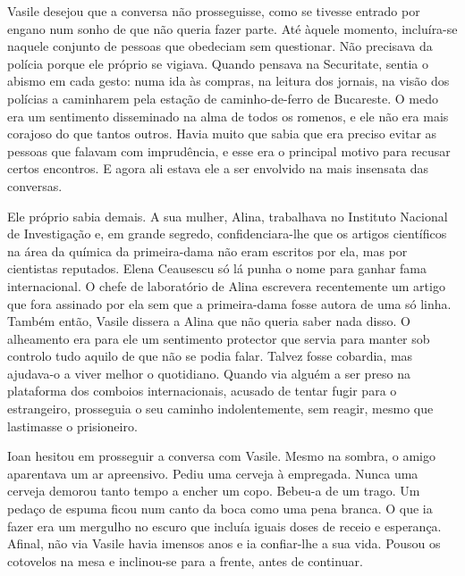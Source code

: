 Vasile desejou que a conversa não prosseguisse, como se tivesse entrado
por engano num sonho de que não queria fazer parte. Até àquele momento,
incluíra-se naquele conjunto de pessoas que obedeciam sem questionar.
Não precisava da polícia porque ele próprio se vigiava. Quando pensava
na Securitate, sentia o abismo em cada gesto: numa ida às compras, na
leitura dos jornais, na visão dos polícias a caminharem pela estação de
caminho-de-ferro de Bucareste. O medo era um sentimento disseminado na
alma de todos os romenos, e ele não era mais corajoso do que tantos
outros. Havia muito que sabia que era preciso evitar as pessoas que
falavam com imprudência, e esse era o principal motivo para recusar
certos encontros. E agora ali estava ele a ser envolvido na mais
insensata das conversas.

Ele próprio sabia demais. A sua mulher, Alina, trabalhava no Instituto Nacional de Investigação e, em grande segredo,
confidenciara-lhe que os artigos científicos na área da química da
primeira-dama não eram escritos por ela, mas por cientistas reputados.
Elena Ceausescu só lá punha o nome para ganhar fama internacional. O
chefe de laboratório de Alina escrevera recentemente um artigo que
fora assinado por ela sem que a primeira-dama fosse autora de uma só
linha. Também então, Vasile dissera a Alina que não queria saber nada
disso. O alheamento era para ele um sentimento protector que servia para
manter sob controlo tudo aquilo de que não se podia falar. Talvez fosse
cobardia, mas ajudava-o a viver melhor o quotidiano. Quando via alguém
a ser preso na plataforma dos comboios internacionais, acusado de tentar
fugir para o estrangeiro, prosseguia o seu caminho indolentemente, sem
reagir, mesmo que lastimasse o prisioneiro.

Ioan hesitou em prosseguir a conversa com Vasile. Mesmo na sombra, o
amigo aparentava um ar apreensivo. Pediu uma cerveja à empregada. Nunca
uma cerveja demorou tanto tempo a encher um copo. Bebeu-a de um trago.
Um pedaço de espuma ficou num canto da boca como uma pena branca. O que
ia fazer era um mergulho no escuro que incluía iguais doses de receio e
esperança. Afinal, não via Vasile havia imensos anos e ia confiar-lhe a
sua vida. Pousou os cotovelos na mesa e inclinou-se para a frente, antes
de continuar.

